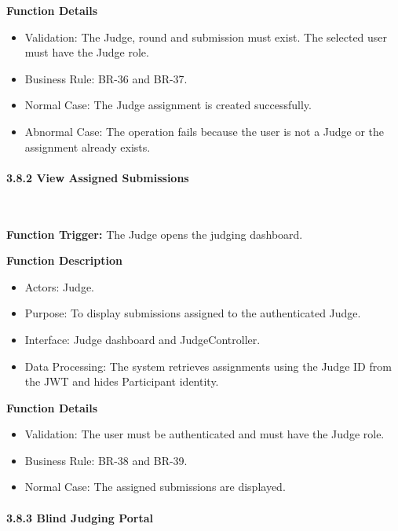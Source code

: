 \textbf{Function Details}
\begin{itemize}[leftmargin=1.5em, nosep]
    \item Validation: The Judge, round and submission must exist. The selected user must have the Judge role.
    \item Business Rule: BR-36 and BR-37.
    \item Normal Case: The Judge assignment is created successfully.
    \item Abnormal Case: The operation fails because the user is not a Judge or the assignment already exists.
\end{itemize}

\paragraph*{3.8.2 View Assigned Submissions}\leavevmode\\[-0.5em]
\label{par:view-assigned-submissions}

\textbf{Function Trigger:} The Judge opens the judging dashboard.

\textbf{Function Description}
\begin{itemize}[leftmargin=1.5em, nosep]
    \item Actors: Judge.
    \item Purpose: To display submissions assigned to the authenticated Judge.
    \item Interface: Judge dashboard and JudgeController.
    \item Data Processing: The system retrieves assignments using the Judge ID from the JWT and hides Participant identity.
\end{itemize}

\textbf{Function Details}
\begin{itemize}[leftmargin=1.5em, nosep]
    \item Validation: The user must be authenticated and must have the Judge role.
    \item Business Rule: BR-38 and BR-39.
    \item Normal Case: The assigned submissions are displayed.
\end{itemize}

\paragraph*{3.8.3 Blind Judging Portal}\leavevmode\\[-0.5em]
\label{par:blind-judging-portal}

